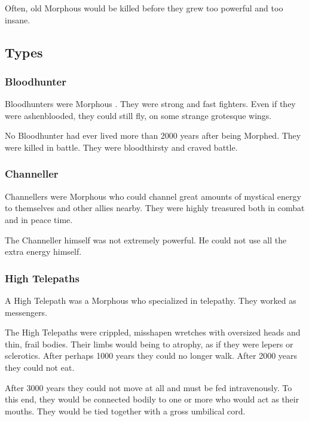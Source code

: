 Often, old Morphous would be killed before they grew too powerful and too insane. 









\subsection{Types}





\subsubsection{Bloodhunter}
Bloodhunters were Morphous \resphain.
They were strong and fast fighters.
Even if they were ashenblooded, they could still fly, on some strange grotesque wings. 

No Bloodhunter had ever lived more than 2000 years after being Morphed. 
They were killed in battle. 
They were bloodthirsty and craved battle. 





\subsubsection{Channeller}
Channellers were Morphous \resphain who could channel great amounts of mystical energy to themselves and other allies nearby. 
They were highly treasured both in combat and in peace time. 

The Channeller himself was not extremely powerful.
He could not use all the extra energy himself.





\subsubsection{High Telepaths}
A High Telepath was a Morphous \resphan{} who specialized in telepathy. 
They worked as messengers. 

The High Telepaths were crippled, misshapen wretches with oversized heads and thin, frail bodies.
Their limbs would being to atrophy, as if they were lepers or sclerotics. 
After perhaps 1000 years they could no longer walk.
After 2000 years they could not eat.

After 3000 years they could not move at all and must be fed intravenously.
To this end, they would be connected bodily to one or more \shapen who would act as their mouths. 
They would be tied together with a gross umbilical cord. 

